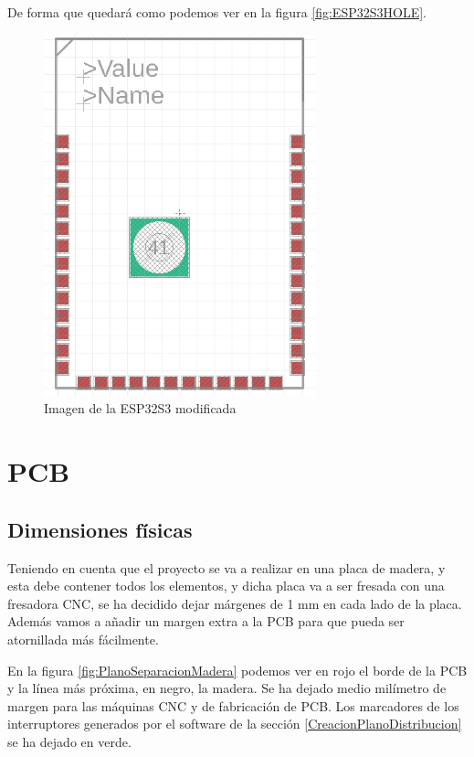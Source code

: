 De forma que quedará como podemos ver en la figura \ref{fig:ESP32S3HOLE}.

\begin{figure}[H]
    \centering
    \includegraphics[width=0.7\textwidth]{imagenes/Capitulos/Cap13/ESP32S3HOLE.png}
    \caption{Imagen de la ESP32S3 modificada}
\end{figure}\label{fig:ESP32S3HOLE}

\section{PCB}\label{ApendicePCB}

\subsection{Dimensiones físicas}
Teniendo en cuenta que el proyecto se va a realizar en una placa de madera, y esta debe contener todos los elementos, y dicha placa va a ser fresada con una fresadora CNC, se ha decidido dejar márgenes de 1 mm en cada lado de la placa. Además vamos a añadir un margen extra a la \gls{PCB} para que pueda ser atornillada más fácilmente.

En la figura \ref{fig:PlanoSeparacionMadera} podemos ver en rojo el borde de la \gls{PCB} y la línea más próxima, en negro, la madera. Se ha dejado medio milímetro de margen para las máquinas \gls{CNC} y de fabricación de \gls{PCB}. Los marcadores de los interruptores generados por el software de la sección \ref{CreacionPlanoDistribucion} se ha dejado en verde.

